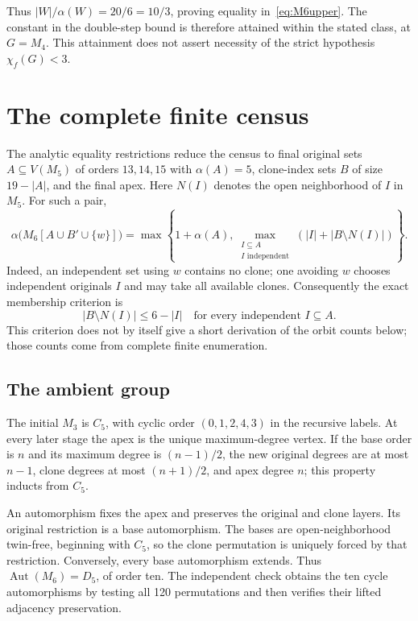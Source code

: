 \documentclass[11pt,letterpaper]{article}
\theoremstyle{remark}
\DeclareMathOperator{\Aut}{Aut}
\newcommand{\abs}[1]{\lvert #1\rvert}
\begin{document}
Thus $\abs W/\alpha(W)=20/6=10/3$, proving equality in~\eqref{eq:M6upper}.
The constant in the double-step bound is therefore attained within the
stated class, at $G=M_4$. This attainment does not assert necessity of the
strict hypothesis $\chi_f(G)<3$.

\section{The complete finite census}\label{sec:census}
The analytic equality restrictions reduce the census to final original
sets $A\subseteq V(M_5)$ of orders $13,14,15$ with $\alpha(A)=5$, clone-index
sets $B$ of size $19-\abs A$, and the final apex. Here $N(I)$ denotes the
open neighborhood of $I$ in $M_5$. For such a pair,
\begin{equation}\label{eq:partial}
 \alpha\bigl(M_6[A\cup B'\cup\{w\}]\bigr)
 =\max\left\{1+\alpha(A),
 \max_{\substack{I\subseteq A\\ I\text{ independent}}}
 (\abs I+\abs{B\setminus N(I)})\right\}.
\end{equation}
Indeed, an independent set using $w$ contains no clone; one avoiding $w$
chooses independent originals $I$ and may take all available clones.
Consequently the exact membership criterion is
\begin{equation}\label{eq:membership}
 \abs{B\setminus N(I)}\le6-\abs I
 \quad\text{for every independent }I\subseteq A.
\end{equation}
This criterion does not by itself give a short derivation of the orbit
counts below; those counts come from complete finite enumeration.

\subsection{The ambient group}
The initial $M_3$ is $C_5$, with cyclic order $(0,1,2,4,3)$ in the recursive
labels. At every later stage the apex is the unique maximum-degree
vertex. If the base order is $n$ and its maximum degree is $(n-1)/2$, the
new original degrees are at most $n-1$, clone degrees at most $(n+1)/2$,
and apex degree $n$; this property inducts from $C_5$.

An automorphism fixes the apex and preserves the original and clone
layers. Its original restriction is a base automorphism. The bases are
open-neighborhood twin-free, beginning with $C_5$, so the clone
permutation is uniquely forced by that restriction. Conversely, every
base automorphism extends. Thus $\Aut(M_6)=D_5$, of order ten.
The independent check obtains the ten cycle automorphisms by testing all
120 permutations and then verifies their lifted adjacency preservation.
\end{document}
